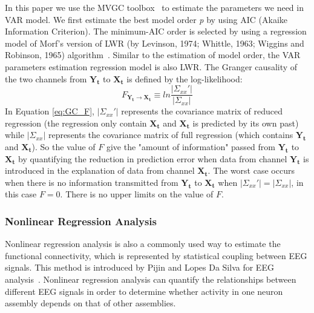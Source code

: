 \documentclass[conference]{IEEEtran}
\begin{document}
In this paper we use the MVGC toolbox~\cite{barnett2014mvgc} to estimate the parameters we need in VAR model. We first estimate the best model order \emph{p} by using AIC (Akaike Information Criterion). The minimum-AIC order is selected by using a regression model of Morf's version of LWR (by Levinson, 1974; Whittle, 1963; Wiggins and Robinson, 1965) algorithm~\cite{morf1978recursive}. Similar to the estimation of model order, the VAR parameters estimation regression model is also LWR. The Granger causality of the two channels from $\mathbf{Y_t}$ to $\mathbf{X_t}$ is defined by the log-likelihood:
\begin{equation} \label{eq:GC_F}
F_{\mathbf{Y_t}\rightarrow \mathbf{X_t}} \equiv ln \frac{|\Sigma_{xx}'|}{|\Sigma_{xx}|}
\end{equation}
In Equation \ref{eq:GC_F}, $|\Sigma_{xx}'|$ represents the covariance matrix of reduced regression (the regression only contain $\mathbf{X_t}$ and $\mathbf{X_t}$ is predicted by its own past) while $|\Sigma_{xx}|$ represents the covariance matrix of full regression (which contains $\mathbf{Y_t}$ and $\mathbf{X_t}$). So the value of $F$ give the "amount of information" passed from $\mathbf{Y_t}$ to $\mathbf{X_t}$ by quantifying the reduction in prediction error when data from channel $\mathbf{Y_t}$ is introduced in the explanation of data from channel $\mathbf{X_t}$. The worst case occurs when there is no information transmitted from $\mathbf{Y_t}$ to $\mathbf{X_t}$ when $|\Sigma_{xx}'|=|\Sigma_{xx}|$, in this case $F=0$. There is no upper limits on the value of $F$.

\subsubsection{Nonlinear Regression Analysis}
Nonlinear regression analysis is also a commonly used way to estimate the functional connectivity, which is represented by statistical coupling between EEG signals. This method is introduced by Pijin and Lopes Da Silva for EEG analysis~\cite{pijn1990localization}. Nonlinear regression analysis can quantify the relationships between different EEG signals in order to determine whether activity in one neuron assembly depends on that of other assemblies.
\end{document}
